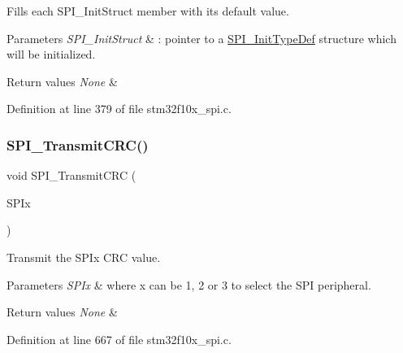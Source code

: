 Fills each S\+P\+I\+\_\+\+Init\+Struct member with its default value. 


\begin{DoxyParams}{Parameters}
{\em S\+P\+I\+\_\+\+Init\+Struct} & \+: pointer to a \hyperlink{struct_s_p_i___init_type_def}{S\+P\+I\+\_\+\+Init\+Type\+Def} structure which will be initialized. \\
\hline
\end{DoxyParams}

\begin{DoxyRetVals}{Return values}
{\em None} & \\
\hline
\end{DoxyRetVals}


Definition at line 379 of file stm32f10x\+\_\+spi.\+c.

\mbox{\label{group___s_p_i___exported___functions_gace8b1058e09bab150b0dbe5978810273}} 
\subsubsection{\texorpdfstring{S\+P\+I\+\_\+\+Transmit\+C\+R\+C()}{SPI\_TransmitCRC()}}
{\footnotesize\ttfamily void S\+P\+I\+\_\+\+Transmit\+C\+RC (\begin{DoxyParamCaption}\item[{\hyperlink{struct_s_p_i___type_def}{S\+P\+I\+\_\+\+Type\+Def} $\ast$}]{S\+P\+Ix }\end{DoxyParamCaption})}



Transmit the S\+P\+Ix C\+RC value. 


\begin{DoxyParams}{Parameters}
{\em S\+P\+Ix} & where x can be 1, 2 or 3 to select the S\+PI peripheral. \\
\hline
\end{DoxyParams}

\begin{DoxyRetVals}{Return values}
{\em None} & \\
\hline
\end{DoxyRetVals}


Definition at line 667 of file stm32f10x\+\_\+spi.\+c.

